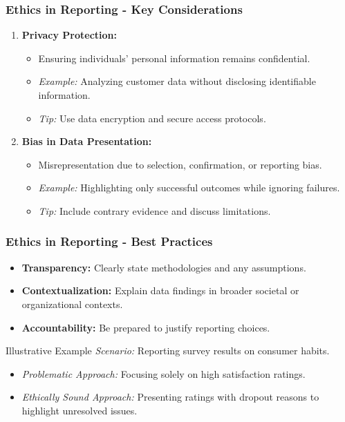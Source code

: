 \documentclass{beamer}
\begin{document}
\begin{frame}[fragile]
    \frametitle{Ethics in Reporting - Key Considerations}
    \begin{enumerate}
        \item \textbf{Privacy Protection:}
            \begin{itemize}
                \item Ensuring individuals' personal information remains confidential.
                \item \textit{Example:} Analyzing customer data without disclosing identifiable information.
                \item \textit{Tip:} Use data encryption and secure access protocols.
            \end{itemize}
        \item \textbf{Bias in Data Presentation:}
            \begin{itemize}
                \item Misrepresentation due to selection, confirmation, or reporting bias.
                \item \textit{Example:} Highlighting only successful outcomes while ignoring failures.
                \item \textit{Tip:} Include contrary evidence and discuss limitations.
            \end{itemize}
    \end{enumerate}
\end{frame}

\begin{frame}[fragile]
    \frametitle{Ethics in Reporting - Best Practices}
    \begin{itemize}
        \item \textbf{Transparency:} Clearly state methodologies and any assumptions.
        \item \textbf{Contextualization:} Explain data findings in broader societal or organizational contexts.
        \item \textbf{Accountability:} Be prepared to justify reporting choices.
    \end{itemize}
    \begin{block}{Illustrative Example}
        \textit{Scenario:} Reporting survey results on consumer habits.
        \begin{itemize}
            \item \textit{Problematic Approach:} Focusing solely on high satisfaction ratings.
            \item \textit{Ethically Sound Approach:} Presenting ratings with dropout reasons to highlight unresolved issues.
        \end{itemize}
    \end{block}
\end{frame}
\end{document}
